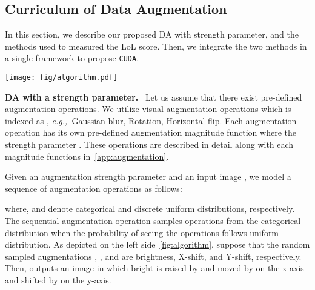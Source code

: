 \documentclass{article}
\newcommand{\eg}{\emph{e.g.,~}}
\newcommand{\myparagraph}[1]{\vspace{0.07cm}\noindent\textbf{#1}~}
\def\code#1{\texttt{#1}}
\newcommand{\alg}{\code{CUDA}\xspace}
\begin{document}
\subsection{Curriculum of Data Augmentation}

In this section, we describe our proposed DA with strength parameter, and the methods used to measured the LoL score. Then, we integrate the two methods in a single framework to propose \alg.

\begin{figure*}[t]
    \centering
    \texttt{[image: fig/algorithm.pdf]}
    \caption{Algorithm overview. \alg is composed of two main parts: (1) strength-based augmentation and (2) Level-of-Learning (LoL) score. To control the difficulty of augmented images, strength-based augmentation utilizes two values, the number of augmentations and their magnitudes. We use the strength-based augmentation module to score the LoL. Based on the measured LoL score, \alg generates adequately augmented images for LTR algorithms.}
    \label{fig:algorithm}
    \vspace{-10pt}
\end{figure*}


\myparagraph{DA with a strength parameter.}
Let us assume that there exist pre-defined  augmentation operations. We utilize visual augmentation operations which is indexed as , \eg Gaussian blur, Rotation, Horizontal flip. Each augmentation operation  has its own pre-defined augmentation magnitude function  where the strength parameter . These operations are described in detail along with each magnitude functions in~\autoref{app:augmentation}.

Given an augmentation strength parameter  and an input image , we model a sequence of augmentation operations   as follows:


where,  and  denote categorical and discrete uniform distributions, respectively. 
The sequential augmentation operation  samples  operations from the categorical distribution when the probability of seeing the operations follows uniform distribution. 
As depicted on the left side~\autoref{fig:algorithm}, suppose that the random sampled augmentations , , and  are brightness, X-shift, and Y-shift, respectively. Then,  outputs an image in which bright is raised by  and moved by  on the x-axis and shifted by  on the y-axis.
\end{document}
